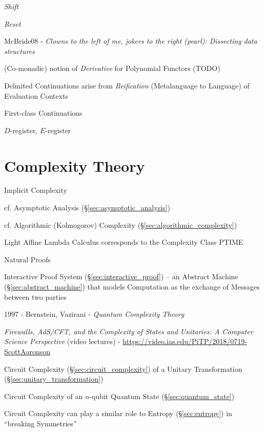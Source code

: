 \emph{Shift}

\emph{Reset}

McBride08 - \emph{Clowns to the left of me, jokers to the right (pearl):
  Dissecting data structures}

(Co-monadic) notion of \emph{Derivative} for Polynomial
Functors (TODO)

Delmited Continuations arise from \emph{Reification} (Metalanguage to Language)
of Evaluation Contexts

First-class Continuations

$D$-register, $E$-register



\section{Complexity Theory}\label{sec:complexity_theory}

Implicit Complexity

cf. Asymptotic Analysis (\S\ref{sec:asymptotic_analysis}) %

\fist cf. Algorithmic (Kolmogorov) Complexity
(\S\ref{sec:algorithmic_complexity})

Light Affine Lambda Calculus corresponds to the Complexity Class PTIME

Natural Proofs %

\fist Interactive Proof System (\S\ref{sec:interactive_proof}) -- an Abstract
Machine (\S\ref{sec:abstract_machine}) that models Computation as the exchange
of Messages between two parties

1997 - Bernstein, Vazirani - \emph{Quantum Complexity Theory}

\asterism

\emph{Firewalls, AdS/CFT, and the Complexity of States and Unitaries: A Computer
  Science Perspective}
(video lectures)
-
\url{https://video.ias.edu/PiTP/2018/0719-ScottAaronson}

Circuit Complexity (\S\ref{sec:circuit_complexity}) of a
Unitary Transformation (\S\ref{sec:unitary_transformation})

Circuit Complexity of an $n$-qubit Quantum State (\S\ref{sec:quantum_state})

Circuit Complexity can play a similar role to Entropy (\S\ref{sec:entropy}) in
``breaking Symmetries''

